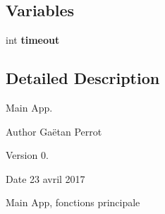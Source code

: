 \subsection*{Variables}
\begin{DoxyCompactItemize}
\item 
int {\bfseries timeout}\hypertarget{main-app_8c_a493b57f443cc38b3d3df9c1e584d9d82}{}\label{main-app_8c_a493b57f443cc38b3d3df9c1e584d9d82}

\end{DoxyCompactItemize}


\subsection{Detailed Description}
Main App. 

\begin{DoxyAuthor}{Author}
Gaëtan Perrot 
\end{DoxyAuthor}
\begin{DoxyVersion}{Version}
0. 
\end{DoxyVersion}
\begin{DoxyDate}{Date}
23 avril 2017
\end{DoxyDate}
Main App, fonctions principale 